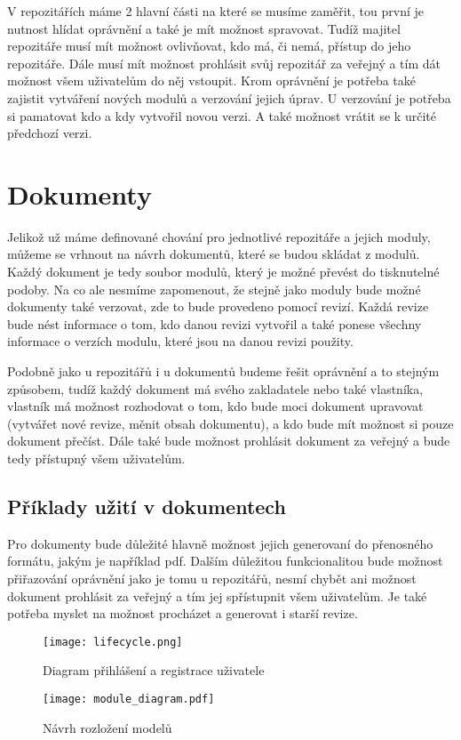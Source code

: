 V repozitářích máme 2 hlavní části na které se musíme zaměřit, tou první je nutnost hlídat oprávnění a také je mít možnost spravovat. Tudíž majitel
repozitáře musí mít možnost ovlivňovat, kdo má, či nemá, přístup do jeho repozitáře. Dále musí mít možnost prohlásit svůj repozitář za veřejný a tím
dát možnost všem uživatelům do něj vstoupit. Krom oprávnění je potřeba také zajistit vytváření nových modulů a verzování jejich úprav. U verzování je
potřeba si pamatovat kdo a kdy vytvořil novou verzi. A také možnost vrátit se k určité předchozí verzi.

\section{Dokumenty}

Jelikož už máme definované chování pro jednotlivé repozitáře a jejich moduly, můžeme se vrhnout na návrh dokumentů, které se budou skládat z modulů. Každý
dokument je tedy soubor modulů, který je možné převést do tisknutelné podoby. Na co ale nesmíme zapomenout, že stejně jako moduly bude možné dokumenty také
verzovat, zde to bude provedeno pomocí revizí. Každá revize bude nést informace o tom, kdo danou revizi vytvořil a také ponese všechny informace o verzích
modulu, které jsou na danou revizi použity.

Podobně jako u repozitářů i u dokumentů budeme řešit oprávnění a to stejným způsobem, tudíž každý dokument má svého zakladatele nebo také vlastníka,
vlastník má možnost rozhodovat o tom, kdo bude moci dokument upravovat (vytvářet nové revize, měnit obsah dokumentu), a kdo bude mít možnost si pouze dokument
přečíst. Dále také bude možnost prohlásit dokument za veřejný a bude tedy přístupný všem uživatelům.

\subsection{Příklady užití v dokumentech}

Pro dokumenty bude důležité hlavně možnost jejich generovaní do přenosného formátu, jakým je například \gls{pdf}. Dalším důležitou funkcionalitou bude možnost přiřazování
oprávnění jako je tomu u repozitářů, nesmí chybět ani možnost dokument prohlásit za veřejný a tím jej spřístupnit všem uživatelům. Je také potřeba myslet na možnost
procházet a generovat i starší revize.

\begin{figure}[h]
    \centering
    \texttt{[image: lifecycle.png]}
    \caption{Diagram přihlášení a registrace uživatele}
    \label{fig:userFlow}
\end{figure}


\begin{figure}[h]
    \centering
    \texttt{[image: module\_diagram.pdf]}
    \caption{Návrh rozložení modelů}
    \label{fig:moduleDia}
\end{figure}